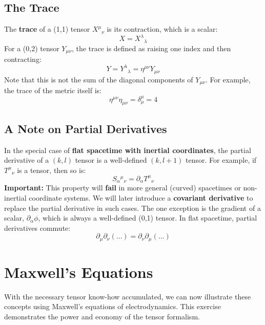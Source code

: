 \documentclass[11pt, a4paper]{report}
\begin{document}
\subsection*{The Trace}

The \textbf{trace} of a (1,1) tensor ${X^\mu}_\nu$ is its contraction, which is a scalar:
\begin{equation}
    X = {X^\lambda}_\lambda
\end{equation}
For a (0,2) tensor $Y_{\mu\nu}$, the trace is defined as raising one index and then contracting:
\begin{equation}
    Y = {Y^\lambda}_\lambda = \eta^{\mu\nu}Y_{\mu\nu}
\end{equation}
Note that this is not the sum of the diagonal components of $Y_{\mu\nu}$. For example, the trace of the metric itself is:
\begin{equation}
    \eta^{\mu\nu}\eta_{\mu\nu} = \delta^\mu_\mu = 4
\end{equation}

\subsection*{A Note on Partial Derivatives}

In the special case of \textbf{flat spacetime with inertial coordinates}, the partial derivative of a $(k,l)$ tensor is a well-defined $(k, l+1)$ tensor. For example, if ${T^\mu}_\nu$ is a tensor, then so is:
\begin{equation}
    S_{\alpha}{}^\mu{}_\nu = \partial_\alpha {T^\mu}_\nu
\end{equation}
\textbf{Important:} This property will \textbf{fail} in more general (curved) spacetimes or non-inertial coordinate systems. We will later introduce a \textbf{covariant derivative} to replace the partial derivative in such cases. The one exception is the gradient of a scalar, $\partial_\alpha\phi$, which is always a well-defined (0,1) tensor. In flat spacetime, partial derivatives commute:
\begin{equation}
    \partial_\mu \partial_\nu (\dots) = \partial_\nu \partial_\mu (\dots)
\end{equation}
\section{Maxwell's Equations}

With the necessary tensor know-how accumulated, we can now illustrate these concepts using Maxwell's equations of electrodynamics. This exercise demonstrates the power and economy of the tensor formalism.
\end{document}
